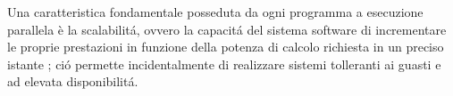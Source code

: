 Una caratteristica fondamentale posseduta da ogni programma a esecuzione parallela
è la scalabilit\'a, ovvero la capacit\'a del sistema software di incrementare le proprie prestazioni in funzione della potenza di calcolo richiesta in un preciso istante \cite{Michael2007}; ci\'o permette incidentalmente di realizzare sistemi tolleranti ai guasti e ad elevata disponibilit\'a.
